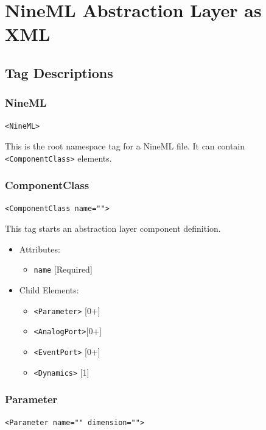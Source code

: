 \documentclass{article}
\begin{document}
\section{NineML Abstraction Layer as XML}

\subsection{Tag Descriptions}

\subsubsection{NineML}
%
\begin{lstlisting}
<NineML>
\end{lstlisting}

This is the root namespace tag for a NineML file. It can contain
\verb|<ComponentClass>| elements.

\subsubsection{ComponentClass}
%
\begin{lstlisting}
<ComponentClass name="">
\end{lstlisting}

This tag starts an abstraction layer component definition.

\begin{itemize}
\item Attributes:
%
\begin{itemize}
\item \verb|name| {[}Required{]}
\end{itemize}

\item Child Elements:
%
\begin{itemize}
\item \verb|<Parameter>| {[}0+{]}
\item \verb|<AnalogPort>|{[}0+{]}
\item \verb|<EventPort>| {[}0+{]}
\item \verb|<Dynamics>|  {[}1{]}
\end{itemize}

\end{itemize}








\subsubsection{Parameter}
%
\begin{lstlisting}
<Parameter name="" dimension="">
\end{lstlisting}
\end{document}
